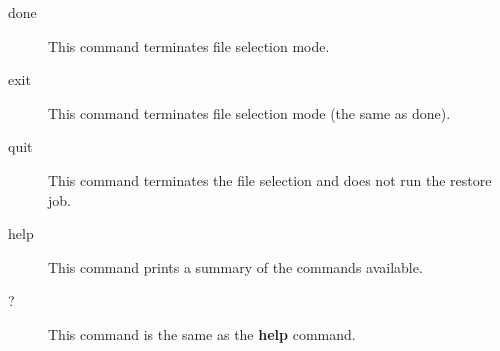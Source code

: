 \begin{description}
\item [done]
   This command terminates file selection mode.  

\item [exit]
   This command terminates file selection mode (the same as  done).  

\item [quit]
   This command terminates the file selection and does  not run the restore job. 


\item [help]
   This command prints a summary of the commands available.  

\item [?]
   This command is the same as the {\bf help} command.  
   \end{description}
